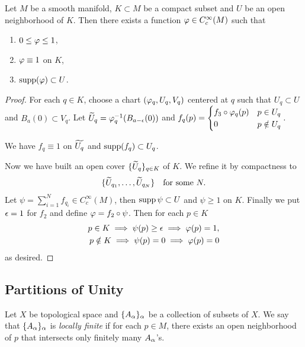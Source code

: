 \begin{lemma}\label{lem:bump_exists}
  Let \(M\) be a smooth manifold, \(K\subset M\) be a compact subset and \(U\) be an open neighborhood of \(K\). Then there exists a function \(\varphi\in C_c^\infty(M)\) such that \begin{enumerate}
    \item \(0 \leq \varphi \leq 1\),
    \item \(\varphi \equiv 1\) on \(K\),
    \item \(\operatorname{supp}(\varphi) \subset U\).
  \end{enumerate}
\end{lemma}
\begin{proof}
  For each \(q\in K\), choose a chart \((\varphi_q,U_q,V_q)\) centered at \(q\) such that \(U_q\subset U\) and \(B_a(0)\subset V_q\).
  Let \(\widetilde{U}_q = \varphi_q^{-1}(B_{a-\epsilon}(0))\) and \(
    f_q(p) = \begin{cases}
      f_3\circ\varphi_q(p) & p \in U_q \\
      0 & p \notin U_q
    \end{cases}.
  \)
  \begin{center}
    
  \end{center}
  We have \(f_q\equiv 1\) on \(\widetilde{U_q}\) and \(\operatorname{supp}(f_q) \subset U_q\).

  Now we have built an open cover \(\{\widetilde{U}_q\}_{q\in K}\) of \(K\). We refine it by compactness to \[
    \{\widetilde{U}_{q_1},\ldots,\widetilde{U}_{q_N}\} \quad\text{for some } N.
  \]
  Let \(\psi = \sum_{i=1}^N f_{q_i} \in C_c^\infty(M)\), then \(\operatorname{supp}\psi\subset U\) and \(\psi\geq 1\) on \(K\). Finally we put \(\epsilon = 1\) for \(f_2\) and define \(\varphi = f_2\circ\psi\). Then for each \(p\in K\) \begin{align*}
    p\in K \implies \psi(p) \geq \epsilon \implies \varphi(p) = 1,\\
    p\notin K \implies \psi(p) = 0 \implies \varphi(p) = 0
  \end{align*} as desired.
\end{proof}

\subsection*{Partitions of Unity}

\begin{definition}
  Let \(X\) be topological space and \(\{A_\alpha\}_{\alpha}\) be a collection of subsets of \(X\). We say that \(\{A_\alpha\}_{\alpha}\) is \emph{locally finite} if for each \(p\in M\), there exists an open neighborhood of \(p\) that intersects only finitely many \(A_\alpha\)'s.
\end{definition}

